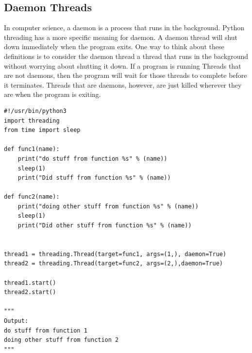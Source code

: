\documentclass{report}
\begin{document}
    \subsection{Daemon Threads}
    \bigbreak \noindent 
    In computer science, a daemon is a process that runs in the background.
    \bigbreak \noindent 
    Python threading has a more specific meaning for daemon. A daemon thread will shut down immediately when the program exits. One way to think about these definitions is to consider the daemon thread a thread that runs in the background without worrying about shutting it down.
    \bigbreak \noindent 
    If a program is running Threads that are not daemons, then the program will wait for those threads to complete before it terminates. Threads that are daemons, however, are just killed wherever they are when the program is exiting.
    \bigbreak \noindent 
    \begin{mdframed}
        \begin{verbatim}
#!/usr/bin/python3
import threading
from time import sleep

def func1(name):
    print("do stuff from function %s" % (name))
    sleep(1)
    print("Did stuff from function %s" % (name))

def func2(name):
    print("doing other stuff from function %s" % (name))
    sleep(1)
    print("Did other stuff from function %s" % (name))


thread1 = threading.Thread(target=func1, args=(1,), daemon=True)
thread2 = threading.Thread(target=func2, args=(2,),daemon=True) 

thread1.start()
thread2.start()

"""
Output:
do stuff from function 1
doing other stuff from function 2
"""
        \end{verbatim}
    \end{mdframed}

    \pagebreak \bigbreak \noindent 
\end{document}
